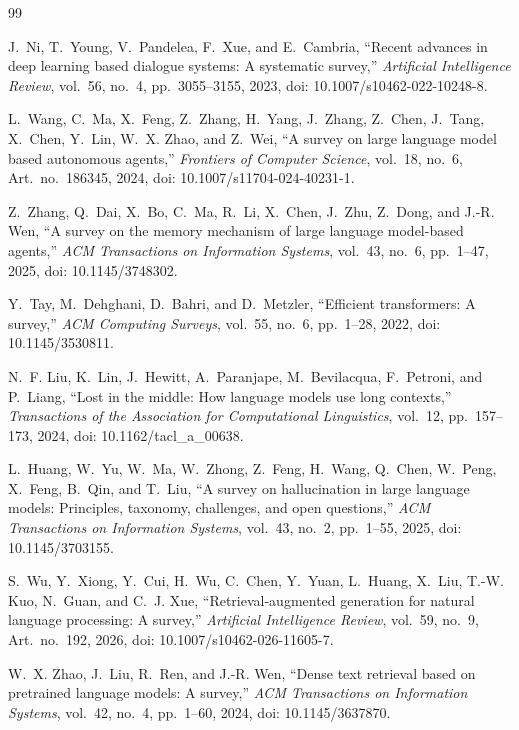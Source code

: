 \documentclass[conference]{IEEEtran}
\begin{document}
\begin{thebibliography}{99}

J.~Ni, T.~Young, V.~Pandelea, F.~Xue, and E.~Cambria, ``Recent advances in deep learning based dialogue systems: A systematic survey,'' \emph{Artificial Intelligence Review}, vol.~56, no.~4, pp.~3055--3155, 2023, doi: 10.1007/s10462-022-10248-8.

L.~Wang, C.~Ma, X.~Feng, Z.~Zhang, H.~Yang, J.~Zhang, Z.~Chen, J.~Tang, X.~Chen, Y.~Lin, W.~X. Zhao, and Z.~Wei, ``A survey on large language model based autonomous agents,'' \emph{Frontiers of Computer Science}, vol.~18, no.~6, Art.~no.~186345, 2024, doi: 10.1007/s11704-024-40231-1.

Z.~Zhang, Q.~Dai, X.~Bo, C.~Ma, R.~Li, X.~Chen, J.~Zhu, Z.~Dong, and J.-R. Wen, ``A survey on the memory mechanism of large language model-based agents,'' \emph{ACM Transactions on Information Systems}, vol.~43, no.~6, pp.~1--47, 2025, doi: 10.1145/3748302.

Y.~Tay, M.~Dehghani, D.~Bahri, and D.~Metzler, ``Efficient transformers: A survey,'' \emph{ACM Computing Surveys}, vol.~55, no.~6, pp.~1--28, 2022, doi: 10.1145/3530811.

N.~F. Liu, K.~Lin, J.~Hewitt, A.~Paranjape, M.~Bevilacqua, F.~Petroni, and P.~Liang, ``Lost in the middle: How language models use long contexts,'' \emph{Transactions of the Association for Computational Linguistics}, vol.~12, pp.~157--173, 2024, doi: 10.1162/tacl\_a\_00638.

L.~Huang, W.~Yu, W.~Ma, W.~Zhong, Z.~Feng, H.~Wang, Q.~Chen, W.~Peng, X.~Feng, B.~Qin, and T.~Liu, ``A survey on hallucination in large language models: Principles, taxonomy, challenges, and open questions,'' \emph{ACM Transactions on Information Systems}, vol.~43, no.~2, pp.~1--55, 2025, doi: 10.1145/3703155.

S.~Wu, Y.~Xiong, Y.~Cui, H.~Wu, C.~Chen, Y.~Yuan, L.~Huang, X.~Liu, T.-W. Kuo, N.~Guan, and C.~J. Xue, ``Retrieval-augmented generation for natural language processing: A survey,'' \emph{Artificial Intelligence Review}, vol.~59, no.~9, Art.~no.~192, 2026, doi: 10.1007/s10462-026-11605-7.

W.~X. Zhao, J.~Liu, R.~Ren, and J.-R. Wen, ``Dense text retrieval based on pretrained language models: A survey,'' \emph{ACM Transactions on Information Systems}, vol.~42, no.~4, pp.~1--60, 2024, doi: 10.1145/3637870.


\end{thebibliography}
\end{document}
